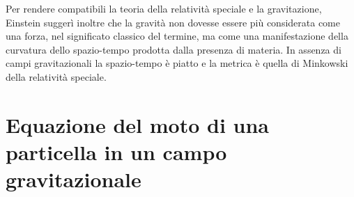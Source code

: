 Per rendere compatibili la teoria della relatività speciale e la gravitazione,
Einstein suggerì inoltre che la gravità non dovesse essere più considerata come
una forza, nel significato classico del termine, ma come una manifestazione
della curvatura dello spazio-tempo prodotta dalla presenza di materia.  In
assenza di campi gravitazionali la spazio-tempo è piatto e la metrica è quella
di Minkowski della relatività speciale.

\section{Equazione del moto di una particella in un campo gravitazionale}
\label{sec:equazione-moto}

